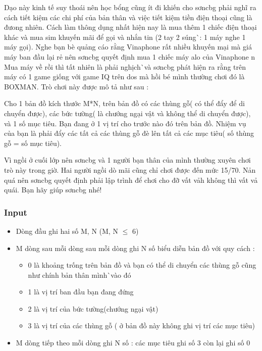 

Dạo này kinh tế suy thoái nên học bổng cũng ít đi khiến cho sơncbg phải nghĩ ra cách tiết kiệm các chi phí của bản thân và việc tiết kiệm tiền điện thoại cũng là đưong nhiên. Cách làm thông dụng nhất hiện nay là mua thêm 1 chiếc điện thoại khác và mua sim khuyến mãi để gọi và nhắn tin (2 tay 2 súng^^ : 1 máy nghe 1 máy gọi). Nghe bạn bè quảng cáo rằng Vinaphone rất nhiều khuyến mại mà giá máy ban đầu lại rẻ nên sơncbg quyết định mua 1 chiếc máy alo của Vinaphone ^^. Mua máy về rồi thì tất nhiên là phải nghịch^^ và sơncbg phát hiện ra rằng trên máy có 1 game giống với game IQ trên dos mà hồi bé mình thường chơi đó là BOXMAN. Trò chơi này được mô tả như sau :

Cho 1 bản đồ kích thước M*N, trên bản đồ có các thùng gỗ( có thể đẩy để di chuyển được), các bức tường( là chướng ngại vật và không thể di chuyển được), và 1 số mục tiêu. Bạn đang ở 1 vị trí cho trước nào đó trên bản đồ. Nhiệm vụ của bạn là phải đẩy các tất cả các thùng gỗ đè lên tất cả các mục tiêu( số thùng gỗ = số mục tiêu).

Vì ngồi ở cuối lớp nên sơncbg và 1 người bạn thân của mình thường xuyên chơi trò này trong giờ. Hai người ngồi dò mãi cũng chỉ chơi được đến mức 15/70. Nản quá nên sơncbg quyết định phải lập trình để chơi cho đỡ vất vả^^( không thì vất vả quá^^). Bạn hãy giúp sơncbg nhé!

\subsubsection{Input}
\begin{itemize}
	\item Dòng đầu ghi hai số M, N (M, N  $\le$  6)
	\item M dòng sau mỗi dòng sau mỗi dòng ghi N số biểu diễn bản đồ với quy cách :
\begin{itemize}
	\item 0 là khoảng trống trên bản đồ và bạn có thể di chuyển các thùng gỗ cũng như chính bản thân mình^^ vào đó
	\item 1 là vị trí ban đầu bạn đang đứng
	\item 2 là vị trí của bức tường(chướng ngại vật)
	\item 3 là vị trí của các thùng gỗ ( ở bản đồ này không ghi vị trí các mục tiêu)
\end{itemize}
	\item M dòng tiếp theo mỗi dòng ghi N số : các mục tiêu ghi số 3 còn lại ghi số 0
\end{itemize}

